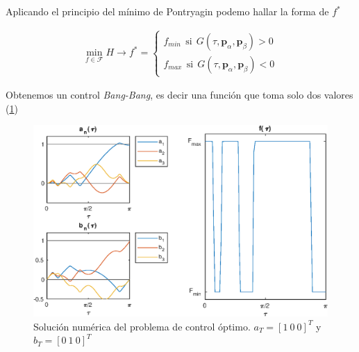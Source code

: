 Aplicando el principio del mínimo de Pontryagin podemo hallar la forma de $f^*$ 

\begin{gather}
    \min_{f \in \mathcal{F}} H \rightarrow f^* = \begin{cases}
        f_{min} \ \  \text{si} \ \ G(\tau,\bm{p}_\alpha,\bm{p}_\beta) > 0  \\
        f_{max} \ \ \text{si}  \ \ G(\tau,\bm{p}_\alpha,\bm{p}_\beta) < 0  
    \end{cases}
\end{gather}

Obtenemos un control \emph{Bang-Bang}, es decir una función que toma solo dos valores (\ref{figbang})



\begin{figure}[]
    \centering
    \includegraphics[scale=0.7]{fig/img03.eps}
    \caption{Solución numérica del problema de control óptimo. $a_T = [1 \ 0 \ 0]^T$ y 
    $b_T = [0 \ 1 \ 0]^T$}
    \label{figbang}
\end{figure}


